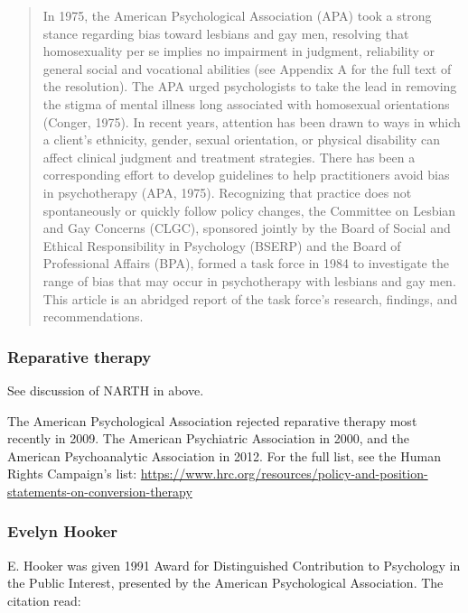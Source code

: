 \begin{refsection}
\begin{quote}

In 1975, the American Psychological Association (APA) took a strong stance regarding bias toward lesbians and gay men, resolving that homosexuality per se implies no impairment in judgment, reliability or general social and vocational abilities (see Appendix A for the full text of the resolution). The APA urged psychologists to take the lead in removing the stigma of mental illness long associated with homosexual orientations (Conger, 1975). In recent years, attention has been drawn to ways in which a client's ethnicity, gender, sexual orientation, or physical disability can affect clinical judgment and treatment strategies. There has been a corresponding effort to develop guidelines to help practitioners avoid bias in psychotherapy (APA, 1975). Recognizing that practice does not spontaneously or quickly follow policy changes, the Committee on Lesbian and Gay Concerns (CLGC), sponsored jointly by the Board of Social and Ethical Responsibility in Psychology (BSERP) and the Board of Professional Affairs (BPA), formed a task force in 1984 to investigate the range of bias that may occur in psychotherapy with lesbians and gay men. This article is an abridged report of the task force's research, findings, and recommendations.
\end{quote}

\subsubsection{Reparative therapy}
\label{reparativetherapy}

See discussion of NARTH in  above.

The American Psychological Association rejected reparative therapy most recently in 2009. The American Psychiatric Association in 2000, and the American Psychoanalytic Association in 2012. For the full list, see the Human Rights Campaign’s list: \url{https://www.hrc.org/resources/policy-and-position-statements-on-conversion-therapy}

\subsubsection{Evelyn Hooker}
\label{evelynhooker}

E. Hooker was given 1991 Award for Distinguished Contribution to Psychology in the Public Interest, presented by the American Psychological Association. The citation read:


\end{refsection}
